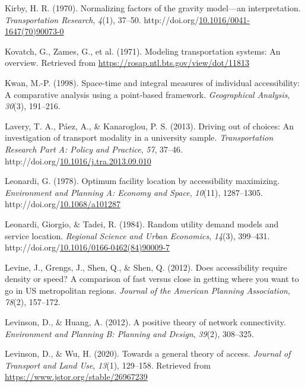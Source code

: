 \documentclass[
11pt, %
oneside, %
english, %
singlespacing, %
]{macthesis} %
\newlength{\cslhangindent}
\newenvironment{CSLReferences}[2] %
{\begin{list}{}{%
	\setlength{\itemindent}{0pt}
	\setlength{\leftmargin}{0pt}
	\setlength{\parsep}{0pt}
	\ifodd #1
	\setlength{\leftmargin}{\cslhangindent}
	\setlength{\itemindent}{-1\cslhangindent}
	\fi
	\setlength{\itemsep}{#2\baselineskip}}}
{\end{list}}
\begin{document}
\begin{CSLReferences}{1}{0}
Kirby, H. R. (1970). Normalizing factors of the gravity model---an interpretation. \emph{Transportation Research}, \emph{4}(1), 37--50. http://doi.org/\href{https://doi.org/10.1016/0041-1647(70)90073-0}{10.1016/0041-1647(70)90073-0}

Kovatch, G., Zames, G., et al. (1971). Modeling transportation systems: An overview. Retrieved from \url{https://rosap.ntl.bts.gov/view/dot/11813}

Kwan, M.-P. (1998). Space-time and integral measures of individual accessibility: A comparative analysis using a point-based framework. \emph{Geographical Analysis}, \emph{30}(3), 191--216.

Lavery, T. A., Páez, A., \& Kanaroglou, P. S. (2013). Driving out of choices: {An} investigation of transport modality in a university sample. \emph{Transportation Research Part A: Policy and Practice}, \emph{57}, 37--46. http://doi.org/\href{https://doi.org/10.1016/j.tra.2013.09.010}{10.1016/j.tra.2013.09.010}

Leonardi, G. (1978). Optimum facility location by accessibility maximizing. \emph{Environment and Planning A: Economy and Space}, \emph{10}(11), 1287--1305. http://doi.org/\href{https://doi.org/10.1068/a101287}{10.1068/a101287}

Leonardi, Giorgio, \& Tadei, R. (1984). Random utility demand models and service location. \emph{Regional Science and Urban Economics}, \emph{14}(3), 399--431. http://doi.org/\href{https://doi.org/10.1016/0166-0462(84)90009-7}{10.1016/0166-0462(84)90009-7}

Levine, J., Grengs, J., Shen, Q., \& Shen, Q. (2012). Does accessibility require density or speed? A comparison of fast versus close in getting where you want to go in US metropolitan regions. \emph{Journal of the American Planning Association}, \emph{78}(2), 157--172.

Levinson, D., \& Huang, A. (2012). A positive theory of network connectivity. \emph{Environment and Planning B: Planning and Design}, \emph{39}(2), 308--325.

Levinson, D., \& Wu, H. (2020). Towards a general theory of access. \emph{Journal of Transport and Land Use}, \emph{13}(1), 129--158. Retrieved from \url{https://www.jstor.org/stable/26967239}


\end{CSLReferences}
\end{document}
